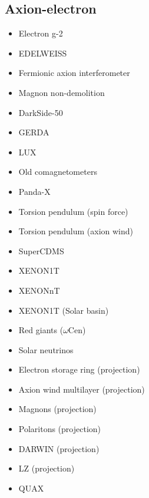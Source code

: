 \documentclass[8pt,twocolumn]{extarticle}
\begin{document}
\begin{mdframed}
\vspace{-1em}
\section{Axion-electron}\vspace{-0.5em}
\begin{itemize}\setlength\itemsep{-0.5em}
	\item Electron g-2~\cite{Yan:2019dar}
    \item EDELWEISS~\cite{EDELWEISS:2018tde}
    \item Fermionic axion interferometer~\cite{Crescini:2023zyl}
    \item Magnon non-demolition~\cite{Ikeda:2021mlv}
    \item DarkSide-50~\cite{DarkSide:2022knj}
    \item GERDA~\cite{GERDA:2020emj}
    \item LUX~\cite{LUX:2017glr}
    \item Old comagnetometers~\cite{Bloch:2019lcy}
    \item Panda-X~\cite{PandaX:2017ock}
    \item Torsion pendulum (spin force)~\cite{Terrano:2015sna}
    \item Torsion pendulum (axion wind)~\cite{Terrano:2019clh}
    \item SuperCDMS~\cite{SuperCDMS:2019jxx}
    \item XENON1T~\cite{XENON:2019gfn,XENON:2020rca}
    \item XENONnT~\cite{XENONCollaboration:2022kmb}
    \item XENON1T (Solar basin)~\cite{VanTilburg:2020jvl}
    \item Red giants ($\omega$Cen)~\cite{Capozzi:2020cbu}
    \item Solar neutrinos~\cite{Gondolo:2008dd}
    \item Electron storage ring (projection)~\cite{Brandenstein:2022eif}
    \item Axion wind multilayer (projection)~\cite{Berlin:2023ubt}
    \item Magnons (projection)~\cite{Chigusa:2020gfs}
        \item Polaritons (projection)~\cite{Mitridate:2020kly}
    \item DARWIN (projection)~\cite{DARWIN:2016hyl}
    \item LZ (projection)~\cite{LZ:2021xov}
    \item QUAX~\cite{Crescini:2018qrz,QUAX:2020adt}

\end{itemize}
\end{mdframed}
\end{document}

